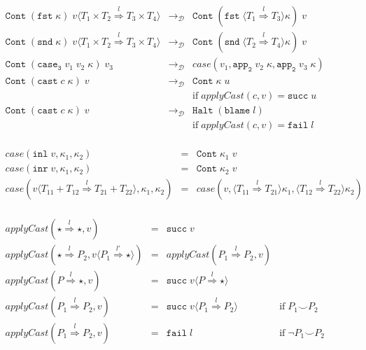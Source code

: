 \documentclass[acmsmall,review,anonymous]{acmart}\settopmatter{printfolios=true,printccs=false,printacmref=false}
\newcommand{\funrule}[3]{#1 &=& #2 & #3\\}
\newcommand{\plus}[0]{+}
\newcommand{\sOOinspect}[3]{\mathtt{Eval} \; #1 \; #2 \; #3}
\newcommand{\sOOreturn}[2]{\mathtt{Cont} \; #2 \; #1}
\newcommand{\sOOhalt}[1]{\mathtt{Halt} \; #1}
\newcommand{\POOprod}[2]{#1 \times #2}
\newcommand{\POOsum}[2]{#1 \plus #2}
\newcommand{\oOOblame}[1]{\mathtt{blame} \; #1}
\newcommand{\cOOcast}[3]{#1 \overset{#2}{\Rightarrow} #3}
\newcommand{\vOOcast}[2]{#1\langle#2\rangle}
\newcommand{\vOOfun}[3]{\mathtt{fun} \; #1 \; #2 \; #3}
\newcommand{\vOOinl}[1]{\mathtt{inl}\;#1}
\newcommand{\vOOinr}[1]{\mathtt{inr}\;#1}
\newcommand{\rOOsucc}[1]{\mathtt{succ}\;#1}
\newcommand{\rOOfail}[1]{\mathtt{fail}\;#1}
\newcommand{\sidecond}[1]{\text{if}\;#1}
\newcommand{\redrule}[3]{#1 & \longrightarrow_\mathcal{D} & #2 & #3\\}
\begin{document}
\begin{figure}
\[\begin{array}{rclr}

	\redrule{
		\sOOreturn{
			\vOOcast{v}{\cOOcast{\POOprod{T_1}{T_2}}{l}{
					\POOprod{T_3}{T_4}}}
			}{(\mathtt{fst} \; \kappa)}
	}{
		\sOOreturn{v}{(
			\mathtt{fst} \;
			\langle \cOOcast{T_1}{l}{T_3} \rangle \kappa
			)}
	}{}

	\redrule{
		\sOOreturn{
			\vOOcast{v}{\cOOcast{\POOprod{T_1}{T_2}}{l}{
					\POOprod{T_3}{T_4}}}
		}{(\mathtt{snd} \; \kappa)}
	}{
		\sOOreturn{v}{(
			\mathtt{snd} \;
			\langle \cOOcast{T_2}{l}{T_4} \rangle \kappa
			)}
	}{}

	\redrule{
		\sOOreturn{v_3}{(
			\mathtt{case_3} \;
			v_1 \; v_2 \;
			\kappa
		)}
	}{case(v_1,
	\mathtt{app_2} \; v_2 \; \kappa,
	\mathtt{app_2} \; v_3 \; \kappa
	)}{}

	\redrule{
		\sOOreturn{v}{(
			\mathtt{cast} \; c \; \kappa
		)}
	}{
		\sOOreturn{u}{\kappa}
		\\ &
	}{
		\sidecond{applyCast(c,v) = \rOOsucc{u}}
	}

	\redrule{
		\sOOreturn{v}{(
			\mathtt{cast} \; c \; \kappa
			)}
	}{
		\sOOhalt{(\oOOblame{l})}
		\\ &
	}{
		\sidecond{applyCast(c,v) = \rOOfail{l}}
	}
	\end{array}
	\]	
	
	\[
	\begin{array}{rclr}
	\funrule{case(\vOOinl{v},\kappa_1,\kappa_2)}{
		\sOOreturn{v}{\kappa_1}
	}{}
	\funrule{case(\vOOinr{v},\kappa_1,\kappa_2)}{
		\sOOreturn{v}{\kappa_2}
	}{}
	\funrule{case(\vOOcast{v}{\cOOcast{\POOsum{T_{11}}{T_{12}}}{l}{\POOsum{T_{21}}{T_{22}}}},\kappa_1,\kappa_2)}{
		case(v,
		\langle \cOOcast{T_{11}}{l}{T_{21}} \rangle \kappa_1,
		\langle \cOOcast{T_{12}}{l}{T_{22}} \rangle \kappa_2)
	}{}
	\end{array}
	\]
	
	\[
	\begin{array}{rclr}
	\funrule{
		applyCast(\cOOcast{\star}{l}{\star},v)
	}{
		\rOOsucc{v}
	}{}
	\funrule{
		applyCast(\cOOcast{\star}{l}{P_2},\vOOcast{v}{\cOOcast{P_1}{l'}{\star}})
	}{
		applyCast(\cOOcast{P_1}{l}{P_2},v)
	}{}
	\funrule{
		applyCast(\cOOcast{P}{l}{\star},v)
	}{
		\rOOsucc{\vOOcast{v}{\cOOcast{P}{l}{\star}}}
	}{}
	\funrule{
		applyCast(\cOOcast{P_1}{l}{P_2},v)
	}{
		\rOOsucc{\vOOcast{v}{\cOOcast{P_1}{l}{P_2}}}
	}{\sidecond{P_1 \smile P_2}}
	\funrule{
		applyCast(\cOOcast{P_1}{l}{P_2},v)
	}{
		\rOOfail{l}
	}{\sidecond{\neg P_1 \smile P_2}}
	

\end{array}\]
\end{figure}
\end{document}
